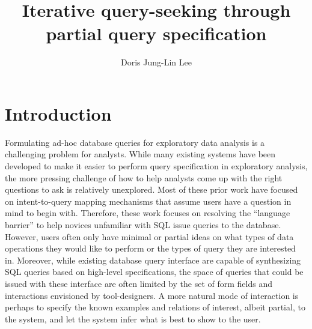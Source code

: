 \documentclass{sig-alternate-05-2015}
\def\plaintitle{Iterative query-seeking through partial query specification}
\def\plainauthor{Doris Jung-Lin Lee}
\begin{document}

%
\title{\plaintitle}
\author{\plainauthor}
\maketitle
\section{Introduction}
Formulating ad-hoc database queries for exploratory data analysis is a challenging problem for analysts. %
While many existing systems have been developed to make it easier to perform query specification in exploratory analysis\cite{Khoussainova2010,Nandi2013,Wu2013,Vartak2015,Abouzied2012,Jiang2015}, the more pressing challenge of how to help analysts come up with the right questions to ask is relatively unexplored. Most of these prior work have focused on intent-to-query mapping mechanisms that assume users have a question in mind to begin with. Therefore, these work focuses on resolving the ``language barrier'' to help novices unfamiliar with SQL issue queries to the database. However, users often only have minimal or partial ideas on what types of data operations they would like to perform or the types of query they are interested in. Moreover, while existing database query interface are capable of synthesizing SQL queries based on high-level specifications, the space of queries that could be issued with these interface are often limited by the set of form fields and interactions envisioned by tool-designers. A more natural mode of interaction is perhaps to specify the known examples and relations of interest, albeit partial, to the system, and let the system infer what is best to show to the user.
\end{document}
